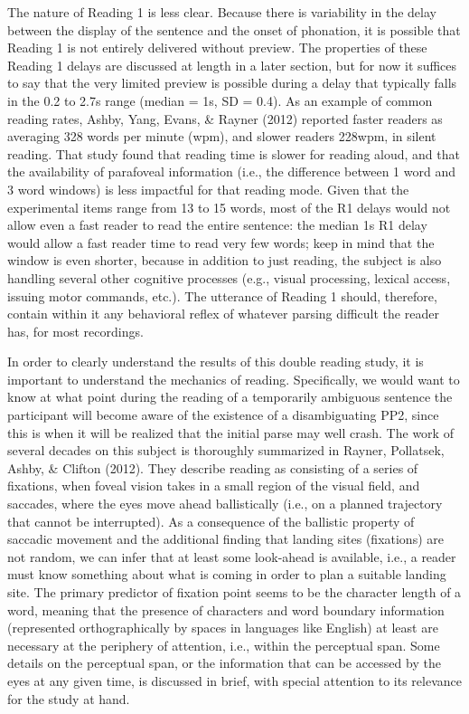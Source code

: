 \documentclass[12pt,oneside]{book}
\begin{document}
The nature of Reading 1 is less clear. Because there is variability in the delay between the display of the sentence and the onset of phonation, it is possible that Reading 1 is not entirely delivered without preview. The properties of these Reading 1 delays are discussed at length in a later section, but for now it suffices to say that the very limited preview is possible during a delay that typically falls in the 0.2 to 2.7s range (median = 1s, SD = 0.4). As an example of common reading rates, Ashby, Yang, Evans, \& Rayner (2012) reported faster readers as averaging 328 words per minute (wpm), and slower readers 228wpm, in silent reading. That study found that reading time is slower for reading aloud, and that the availability of parafoveal information (i.e., the difference between 1 word and 3 word windows) is less impactful for that reading mode. Given that the experimental items range from 13 to 15 words, most of the R1 delays would not allow even a fast reader to read the entire sentence: the median 1s R1 delay would allow a fast reader time to read very few words; keep in mind that the window is even shorter, because in addition to just reading, the subject is also handling several other cognitive processes (e.g., visual processing, lexical access, issuing motor commands, etc.). The utterance of Reading 1 should, therefore, contain within it any behavioral reflex of whatever parsing difficult the reader has, for most recordings.

In order to clearly understand the results of this double reading study, it is important to understand the mechanics of reading. Specifically, we would want to know at what point during the reading of a temporarily ambiguous sentence the participant will become aware of the existence of a disambiguating PP2, since this is when it will be realized that the initial parse may well crash. The work of several decades on this subject is thoroughly summarized in Rayner, Pollatsek, Ashby, \& Clifton (2012). They describe reading as consisting of a series of fixations, when foveal vision takes in a small region of the visual field, and saccades, where the eyes move ahead ballistically (i.e., on a planned trajectory that cannot be interrupted). As a consequence of the ballistic property of saccadic movement and the additional finding that landing sites (fixations) are not random, we can infer that at least some look-ahead is available, i.e., a reader must know something about what is coming in order to plan a suitable landing site. The primary predictor of fixation point seems to be the character length of a word, meaning that the presence of characters and word boundary information (represented orthographically by spaces in languages like English) at least are necessary at the periphery of attention, i.e., within the perceptual span. Some details on the perceptual span, or the information that can be accessed by the eyes at any given time, is discussed in brief, with special attention to its relevance for the study at hand.
\end{document}
